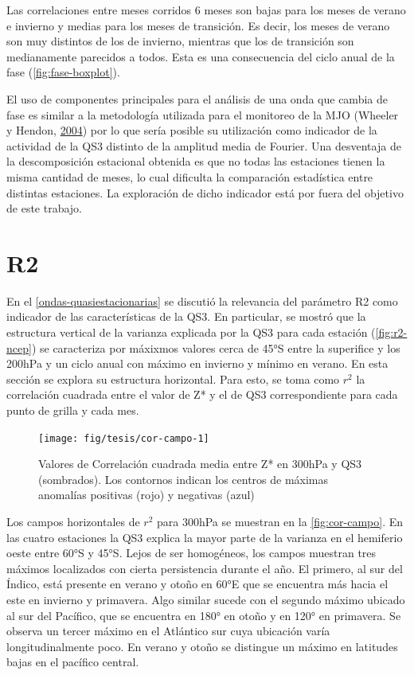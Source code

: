 \documentclass[spanish,a4paper,12pt,oneside]{book}
\begin{document}
Las correlaciones entre meses corridos 6 meses son bajas para los meses
de verano e invierno y medias para los meses de transición. Es decir,
los meses de verano son muy distintos de los de invierno, mientras que
los de transición son medianamente parecidos a todos. Esta es una
consecuencia del ciclo anual de la fase (\autoref{fig:fase-boxplot}).

El uso de componentes principales para el análisis de una onda que
cambia de fase es similar a la metodología utilizada para el monitoreo
de la MJO (Wheeler y Hendon, \protect\hyperlink{ref-Wheeler2004}{2004})
por lo que sería posible su utilización como indicador de la actividad
de la QS3 distinto de la amplitud media de Fourier. Una desventaja de la
descomposición estacional obtenida es que no todas las estaciones tienen
la misma cantidad de meses, lo cual dificulta la comparación estadística
entre distintas estaciones. La exploración de dicho indicador está por
fuera del objetivo de este trabajo.

\section{R2}\label{r2}

En el \autoref{ondas-quasiestacionarias} se discutió la relevancia del
parámetro R2 como indicador de las características de la QS3. En
particular, se mostró que la estructura vertical de la varianza
explicada por la QS3 para cada estación (\autoref{fig:r2-ncep}) se
caracteriza por máxixmos valores cerca de 45°S entre la superifice y los
200hPa y un ciclo anual con máximo en invierno y mínimo en verano. En
esta sección se explora su estructura horizontal. Para esto, se toma
como \(r^2\) la correlación cuadrada entre el valor de Z* y el de QS3
correspondiente para cada punto de grilla y cada mes.

\begin{figure}
\texttt{[image: fig/tesis/cor-campo-1]} \caption{Valores de Correlación cuadrada media entre Z* en 300hPa y QS3 (sombrados). Los contornos indican los centros de máximas anomalías positivas (rojo) y negativas (azul)}\label{fig:cor-campo}
\end{figure}

Los campos horizontales de \(r^2\) para 300hPa se muestran en la
\autoref{fig:cor-campo}. En las cuatro estaciones la QS3 explica la
mayor parte de la varianza en el hemiferio oeste entre 60°S y 45°S.
Lejos de ser homogéneos, los campos muestran tres máximos localizados
con cierta persistencia durante el año. El primero, al sur del Índico,
está presente en verano y otoño en 60°E que se encuentra más hacia el
este en invierno y primavera. Algo similar sucede con el segundo máximo
ubicado al sur del Pacífico, que se encuentra en 180° en otoño y en 120°
en primavera. Se observa un tercer máximo en el Atlántico sur cuya
ubicación varía longitudinalmente poco. En verano y otoño se distingue
un máximo en latitudes bajas en el pacífico central.
\end{document}
